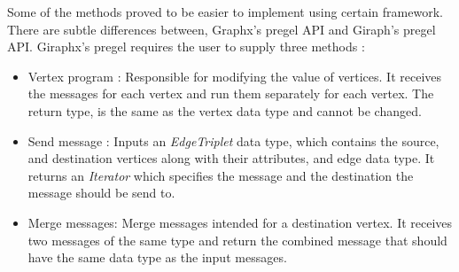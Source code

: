 \documentclass[english]{tktltiki}
\begin{document}
Some of the methods proved to be easier to implement using certain framework. There are subtle differences between, Graphx's pregel API and Giraph's pregel API. Giraphx's pregel requires the user to supply three methods : 
\begin{itemize}
\item Vertex program : Responsible for modifying the value of vertices. It receives the messages for each vertex and run them separately for each vertex. The return type, is the same as the vertex data type and cannot be changed.
\item Send message : Inputs an \textit{EdgeTriplet} data type, which contains the source, and destination vertices along with their attributes, and edge data type. It returns an \textit{Iterator} which specifies the message and the destination the message should be send to.
\item Merge messages: Merge messages intended for a destination vertex. It receives two messages of the same type and return the combined message that should have the same data type as the input messages.
\end{itemize}
\end{document}
